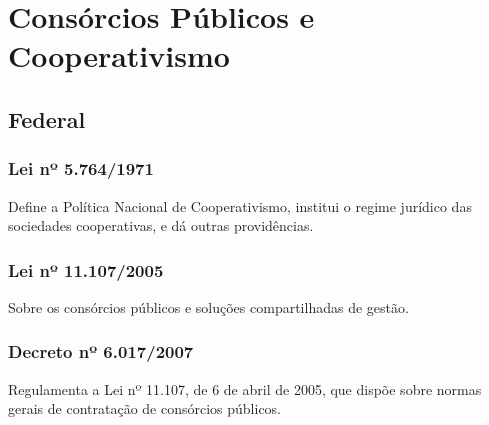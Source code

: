 \section{Consórcios Públicos e Cooperativismo}

\begin{subapend}
	\subsection{Federal}
	\begin{subsubapend}
		\item \subsubsection{Lei nº 5.764/1971}
		Define a Política Nacional de Cooperativismo, institui o regime jurídico das sociedades cooperativas, e dá outras providências.
		\subsubsection{Lei nº 11.107/2005}
		Sobre os consórcios públicos e soluções compartilhadas de gestão.
		\subsubsection{Decreto nº 6.017/2007}
		Regulamenta a Lei nº 11.107, de 6 de abril de 2005, que dispõe sobre normas gerais de contratação de consórcios públicos.
	\end{subsubapend}
\end{subapend}

